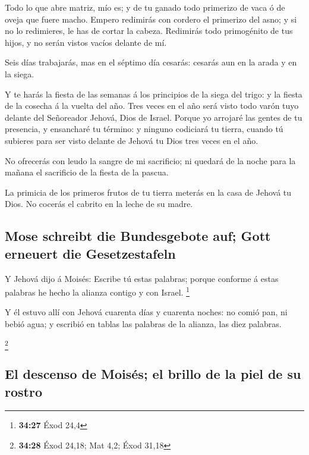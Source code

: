  Todo lo que abre matriz, mío es; y de tu ganado todo
primerizo de vaca ó de oveja que fuere macho.  Empero
redimirás con cordero el primerizo del asno; y si no lo redimieres, le
has de cortar la cabeza. Redimirás todo primogénito de tus hijos, y no
serán vistos vacíos delante de mí.

 Seis días trabajarás, mas en el séptimo día cesarás:
cesarás aun en la arada y en la siega.

 Y te harás la fiesta de las semanas á los principios de
la siega del trigo: y la fiesta de la cosecha á la vuelta del año.
 Tres veces en el año será visto todo varón tuyo delante
del Señoreador Jehová, Dios de Israel.  Porque yo
arrojaré las gentes de tu presencia, y ensancharé tu término: y ninguno
codiciará tu tierra, cuando tú subieres para ser visto delante de Jehová
tu Dios tres veces en el año.

 No ofrecerás con leudo la sangre de mi sacrificio; ni
quedará de la noche para la mañana el sacrificio de la fiesta de la
pascua.

 La primicia de los primeros frutos de tu tierra meterás
en la casa de Jehová tu Dios. No cocerás el cabrito en la leche de su
madre.

\hypertarget{mose-schreibt-die-bundesgebote-auf-gott-erneuert-die-gesetzestafeln}{%
\subsection{Mose schreibt die Bundesgebote auf; Gott erneuert die
Gesetzestafeln}\label{mose-schreibt-die-bundesgebote-auf-gott-erneuert-die-gesetzestafeln}}

 Y Jehová dijo á Moisés: Escribe tú estas palabras;
porque conforme á estas palabras he hecho la alianza contigo y con
Israel. \footnote{\textbf{34:27} Éxod 24,4}

 Y él estuvo allí con Jehová cuarenta días y cuarenta
noches: no comió pan, ni bebió agua; y escribió en tablas las palabras
de la alianza, las diez palabras.

\footnote{\textbf{34:28} Éxod 24,18; Mat 4,2; Éxod 31,18}

\hypertarget{el-descenso-de-moisuxe9s-el-brillo-de-la-piel-de-su-rostro}{%
\subsection{El descenso de Moisés; el brillo de la piel de su
rostro}\label{el-descenso-de-moisuxe9s-el-brillo-de-la-piel-de-su-rostro}}

